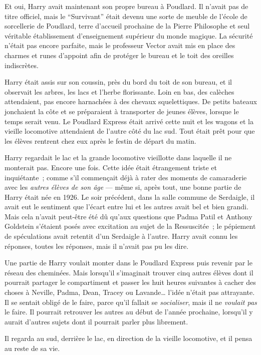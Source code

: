 Et oui, Harry avait maintenant son propre bureau à Poudlard. Il n'avait pas de titre officiel, mais le “Survivant” était devenu une sorte de meuble de l'école de sorcellerie de Poudlard, terre d'accueil prochaine de la Pierre Philosophe et seul véritable établissement d'enseignement supérieur du monde magique. La sécurité n'était pas encore parfaite, mais le professeur Vector avait mis en place des charmes et runes d'appoint afin de protéger le bureau et le toit des oreilles indiscrètes.

Harry était assis sur son coussin, près du bord du toit de son bureau, et il observait les arbres, les lacs et l'herbe florissante. Loin en bas, des calèches attendaient, pas encore harnachées à des chevaux squelettiques. De petits bateaux jonchaient la côte et se préparaient à transporter de jeunes élèves, lorsque le temps serait venu. Le Poudlard Express était arrivé cette nuit et les wagons et la vieille locomotive attendaient de l'autre côté du lac sud. Tout était prêt pour que les élèves rentrent chez eux après le festin de départ du matin.

Harry regardait le lac et la grande locomotive vieillotte dans laquelle il ne monterait pas. Encore une fois. Cette idée était étrangement triste et inquiétante~; comme s'il commençait déjà à rater des moments de camaraderie avec les \emph{autres élèves de son âge} — même si, après tout, une bonne partie de Harry était née en 1926. Le soir précédent, dans la salle commune de Serdaigle, il avait eut le sentiment que l'écart entre lui et les autres avait bel et bien grandi. Mais cela n'avait peut-être été dû qu'aux questions que Padma Patil et Anthony Goldstein s'étaient posés avec excitation au sujet de la Ressuscitée~; le pépiement de spéculations avait retentit d'un Serdaigle à l'autre. Harry avait connu les réponses, toutes les réponses, mais il n'avait pas pu les dire.

Une partie de Harry voulait monter dans le Poudlard Express puis revenir par le réseau des cheminées. Mais lorsqu'il s'imaginait trouver cinq autres élèves dont il pourrait partager le compartiment et passer les huit heures suivantes à cacher des choses à Neville, Padma, Dean, Tracey ou Lavande… l'idée n'était pas attrayante. Il se sentait obligé de le faire, parce qu'il fallait se \emph{socialiser}, mais il ne \emph{voulait pas} le faire. Il pourrait retrouver les autres au début de l'année prochaine, lorsqu'il y aurait d'autres sujets dont il pourrait parler plus librement.

Il regarda au sud, derrière le lac, en direction de la vieille locomotive, et il pensa au reste de sa vie.

